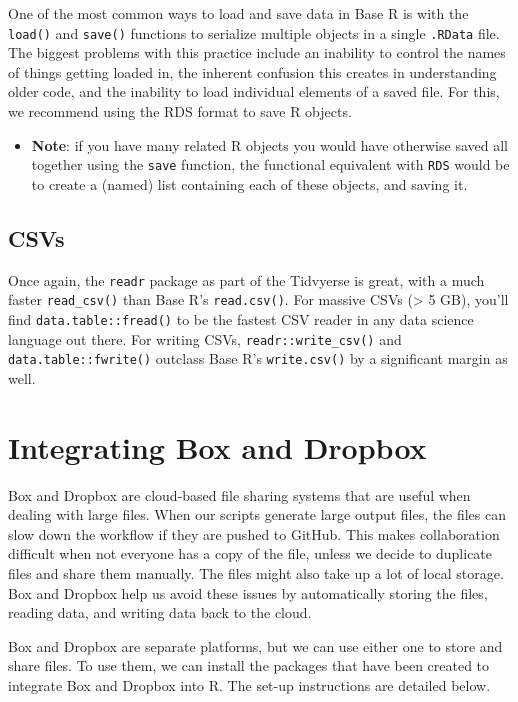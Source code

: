 \documentclass[
]{book}
\providecommand{\tightlist}{%
  \setlength{\itemsep}{0pt}\setlength{\parskip}{0pt}}
\begin{document}
One of the most common ways to load and save data in Base R is with the \texttt{load()} and \texttt{save()} functions to serialize multiple objects in a single \texttt{.RData} file. The biggest problems with this practice include an inability to control the names of things getting loaded in, the inherent confusion this creates in understanding older code, and the inability to load individual elements of a saved file. For this, we recommend using the RDS format to save R objects.

\begin{itemize}
\tightlist
\item
  \textbf{Note}: if you have many related R objects you would have otherwise saved all together using the \texttt{save} function, the functional equivalent with \texttt{RDS} would be to create a (named) list containing each of these objects, and saving it.
\end{itemize}

\subsection{CSVs}\label{csvs}

Once again, the \texttt{readr} package as part of the Tidvyerse is great, with a much faster \texttt{read\_csv()} than Base R's \texttt{read.csv()}. For massive CSVs (\textgreater{} 5 GB), you'll find \texttt{data.table::fread()} to be the fastest CSV reader in any data science language out there. For writing CSVs, \texttt{readr::write\_csv()} and \texttt{data.table::fwrite()} outclass Base R's \texttt{write.csv()} by a significant margin as well.

\section{Integrating Box and Dropbox}\label{integrating-box-and-dropbox}

Box and Dropbox are cloud-based file sharing systems that are useful when dealing with large files. When our scripts generate large output files, the files can slow down the workflow if they are pushed to GitHub. This makes collaboration difficult when not everyone has a copy of the file, unless we decide to duplicate files and share them manually. The files might also take up a lot of local storage. Box and Dropbox help us avoid these issues by automatically storing the files, reading data, and writing data back to the cloud.

Box and Dropbox are separate platforms, but we can use either one to store and share files. To use them, we can install the packages that have been created to integrate Box and Dropbox into R. The set-up instructions are detailed below.
\end{document}
